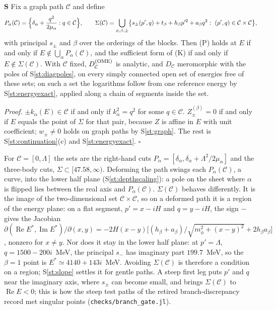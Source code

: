\documentclass[11pt]{article}
\newcommand{\file}[1]{\nolinkurl{#1}}
\newcounter{stmt}
\newenvironment{stmt}[1]{\par\smallskip\refstepcounter{stmt}\noindent\textbf{S\thestmt}\enspace[\textsf{#1}]\enspace\ignorespaces}{\par\smallskip}
\newcommand{\Sr}[1]{S\ref{#1}}
\begin{document}
\begin{stmt}{theorem}\label{st:eplane}
Fix a graph path $\mathcal C$ and define
\[
P_\alpha(\mathcal C)=\Bigl\{\delta_\alpha+\frac{q^2}{2\mu_\alpha}:q\in\mathcal C\Bigr\},\qquad
\Sigma(\mathcal C)=\bigcup_{\phi,\beta,\pm}\bigl\{s_\pm(p',q)+t_\beta+h_\beta p'^2+a_\beta q^2:\ (p',q)\in\mathcal C\times\mathcal C\bigr\},
\]
with principal $s_\pm$ and $\beta$ over the orderings of the blocks. Then (P) holds at $E$ if and only if $E\notin\bigcup_\alpha P_\alpha(\mathcal C)$, and the sufficient form of (K) if and only if $E\notin\Sigma(\mathcal C)$. With $\mathcal C$ fixed, $D^{\rm(OME)}_{\mathcal C}$ is analytic, and $D_{\mathcal C}$ meromorphic with the poles of \Sr{st:diagpoles}, on every simply connected open set of energies free of these sets; on such a set the logarithms follow from one reference energy by \Sr{st:energyexact}, applied along a chain of segments inside the set.
\end{stmt}
\noindent\emph{Proof.} $\pm k_\alpha(E)\in\mathcal C$ if and only if $k_\alpha^2=q^2$ for some $q\in\mathcal C$. $Z^{(\beta)}_\pm=0$ if and only if $E$ equals the point of $\Sigma$ for that pair, because $Z$ is affine in $E$ with unit coefficient; $w_\pm\ne0$ holds on graph paths by \Sr{st:graph}. The rest is \Sr{st:continuation}(c) and \Sr{st:energyexact}. $\square$

For $\mathcal C=[0,\Lambda]$ the sets are the right-hand cuts $P_\alpha=[\delta_\alpha,\delta_\alpha+\Lambda^2/2\mu_\alpha]$ and the three-body cuts, $\Sigma\subset[47.58,\infty)$. Deforming the path swings each $P_\alpha(\mathcal C)$, a curve, into the lower half plane (\Sr{st:depthscaling}): a pole on the sheet where $\alpha$ is flipped lies between the real axis and $P_\alpha(\mathcal C)$. $\Sigma(\mathcal C)$ behaves differently. It is the image of the two-dimensional set $\mathcal C\times\mathcal C$, so on a deformed path it is a region of the energy plane: on a flat segment, $p'=x-iH$ and $q=y-iH$, the sign $-$ gives the Jacobian $\partial(\operatorname{Re}E^*,\operatorname{Im}E^*)/\partial(x,y)=-2H(x-y)\bigl[(h_\beta+a_\beta)/\sqrt{m_\phi^2+(x-y)^2}+2h_\beta a_\beta\bigr]$, nonzero for $x\ne y$. Nor does it stay in the lower half plane: at $p'=\Lambda$, $q=1500-200i$~MeV, the principal $s_-$ has imaginary part $199.7$~MeV, so the $\beta=1$ point is $E^*\simeq4140+143i$~MeV. Avoiding $\Sigma(\mathcal C)$ is therefore a condition on a region; \Sr{st:slope} settles it for gentle paths. A steep first leg puts $p'$ and $q$ near the imaginary axis, where $s_\pm$ can become small, and brings $\Sigma(\mathcal C)$ to $\operatorname{Re}E<0$; this is how the steep test paths of the retired branch-discrepancy record met singular points (\file{checks/branch_gate.jl}).
\end{document}
